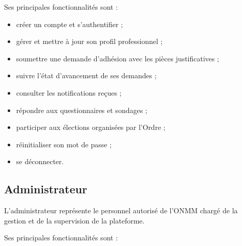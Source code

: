 ﻿\documentclass[12pt,a4paper]{report}
\begin{document}
Ses principales fonctionnalités sont :

\begin{itemize}

\item créer un compte et s’authentifier ;

\item gérer et mettre à jour son profil professionnel ;

\item soumettre une demande d’adhésion avec les pièces justificatives ;

\item suivre l’état d’avancement de ses demandes ;

\item consulter les notifications reçues ;

\item répondre aux questionnaires et sondages ;

\item participer aux élections organisées par l’Ordre ;

\item réinitialiser son mot de passe ;

\item se déconnecter.

\end{itemize}

\subsection{Administrateur}

L'administrateur représente le personnel autorisé de l'ONMM chargé
de la gestion et de la supervision de la plateforme.

Ses principales fonctionnalités sont :
\end{document}
